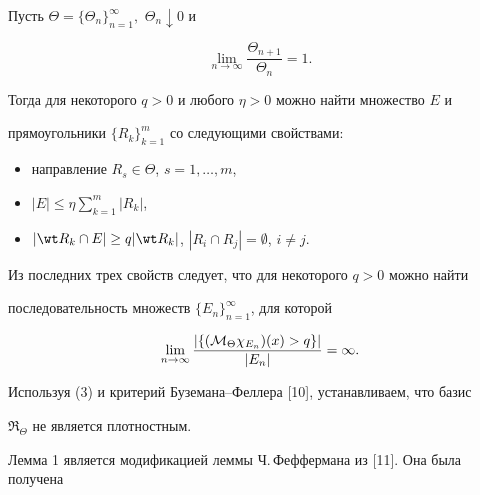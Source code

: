 \begin{lem}


Пусть $\Theta=\{\Theta_n\}_{n=1}^\infty,$ $\Theta_n \downarrow 0$ и


\begin{equation}


\lim_{n \to \infty} \frac {\Theta_{n+1}} {\Theta_n} =1.


\end{equation}


Тогда для некоторого $q>0$ и любого $ \eta >0$ можно найти множество $E$ и


прямоугольники $\{R_k \}_{k=1}^m$ со следующими свойствами$:$


\begin{itemize}


\item[(i)] направление $R_s \in \Theta$, $s=1,\dotsc,m$,


\item[(ii)] $| E | \le \eta \sum\limits_{k=1}^m | R_k |$,


\item[(iii)] $| \wt R_k \cap E | \ge q |


\wt R_k |$, $| R_i \cap R_j | = \emptyset$, $i \ne j$.


\end{itemize}


\end{lem}





Из последних трех свойств следует, что для некоторого $q>0$ можно найти


последовательность множеств $\{E_n \}_{n=1}^{\infty}$, для которой


\begin{equation}


\lim_{n \to \infty} \frac {| \{({\cal M}_{\Theta}


\chi_{E_n}) (x) > q \}


|} {| E_n |} =\infty.


\end{equation}





Используя (3) и критерий Буземана--Феллера [10], устанавливаем, что базис


$\Re_{\Theta}$ не является плотностным.





Лемма 1 является модификацией леммы Ч.\,Феффермана из [11]. Она была получена


